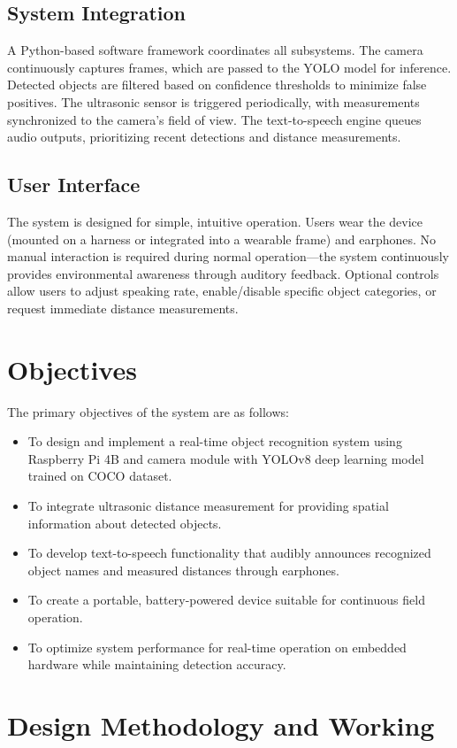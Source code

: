 \documentclass[conference]{IEEEtran}
\begin{document}
\subsection{System Integration}
A Python-based software framework coordinates all subsystems. The camera continuously captures frames, which are passed to the YOLO model for inference. Detected objects are filtered based on confidence thresholds to minimize false positives. The ultrasonic sensor is triggered periodically, with measurements synchronized to the camera's field of view. The text-to-speech engine queues audio outputs, prioritizing recent detections and distance measurements.

\subsection{User Interface}
The system is designed for simple, intuitive operation. Users wear the device (mounted on a harness or integrated into a wearable frame) and earphones. No manual interaction is required during normal operation—the system continuously provides environmental awareness through auditory feedback. Optional controls allow users to adjust speaking rate, enable/disable specific object categories, or request immediate distance measurements.

\section{Objectives}
The primary objectives of the system are as follows:
\begin{itemize}
    \item To design and implement a real-time object recognition system using Raspberry Pi 4B and camera module with YOLOv8 deep learning model trained on COCO dataset.
    \item To integrate ultrasonic distance measurement for providing spatial information about detected objects.
    \item To develop text-to-speech functionality that audibly announces recognized object names and measured distances through earphones.
    \item To create a portable, battery-powered device suitable for continuous field operation.
    \item To optimize system performance for real-time operation on embedded hardware while maintaining detection accuracy.
\end{itemize}

\section{Design Methodology and Working}
\end{document}
